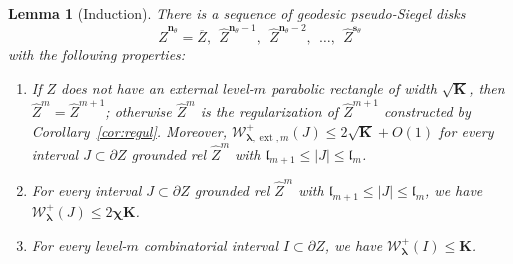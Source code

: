 \documentclass{amsart}
\renewcommand{\sp}{{\ \ }}
\newcommand{\1}{{\mathbb 1 }}
\newcommand{\blambda}{{\boldsymbol\lambda}}
\newcommand{\ext}{{\operatorname{ext}}}
\newcommand{\Width}{{\mathcal W}}
\newcommand{\wZ}{{\widehat Z}}
\newcommand{\bK}{{\mathbf K}}
\newcommand{\bbn}{{\mathbf n}}
\newcommand{\bbs}{{\mathbf s}}
\newcommand{\length}{{\mathfrak l}}
\newtheorem{lem}[thm]{Lemma}
\theoremstyle{remark}
\numberwithin{equation}{section}
\theoremstyle{definition}
\newcommand{\bchi}{{\boldsymbol{ \chi}}}
\begin{document}
\begin{lem}[Induction]
\label{lem:ind:mainthm:v1}
There is a sequence of geodesic pseudo-Siegel disks 
\[  \wZ^{\bbn_\theta} =\overline Z,\sp  \wZ^{\bbn_\theta-1} , \sp \wZ^{\bbn_\theta-2},\sp \dots, \sp \wZ^{\bbs_\theta} \] 
with the following properties:
\begin{enumerate}[label=\text{(\Alph*)},font=\normalfont,leftmargin=*]
\item \label{C1:lem:ind:mainthm:v1} If $Z$ does not have an external level-$m$ parabolic rectangle of width $\sqrt{\bK}$, then $\wZ^m=\wZ^{m+1}$; otherwise $\wZ^m$ is the regularization of $\wZ^{m+1}$ constructed by Corollary~\ref{cor:regul}. Moreover, $\Width^+_{\blambda,\ext, m}(J)\le 2\sqrt {\bK}+O(1)$ for every interval $J\subset \partial Z$ grounded rel $\wZ^{m}$ with  $\length_{m+1}\le |J| \le \length_m$.

\item \label{C2:lem:ind:mainthm:v1}  For every interval $J\subset \partial Z$ grounded rel $\wZ^{m}$ with  $\length_{m+1}\le |J| \le \length_m$, we have $\Width^+_{\blambda}(J)\le 2\bchi \bK$.


\item \label{C3:lem:ind:mainthm:v1}  For every level-$m$ combinatorial interval $I\subset \partial Z$, we have $\Width^+_{\blambda}(I)\le \bK$. %
\end{enumerate}
\end{lem}
\end{document}
